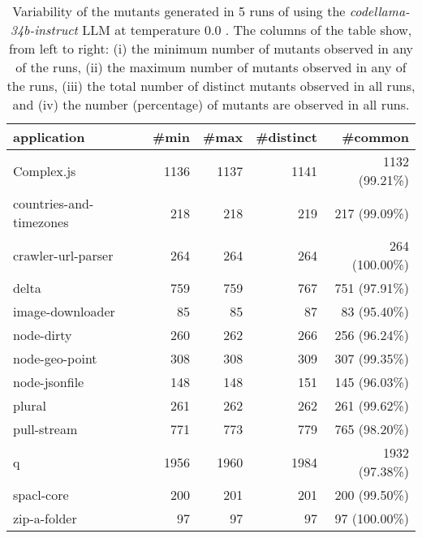 
\begin{table}[hbt!]
\centering
{\footnotesize
\begin{tabular}{l|r|r|r|r}

{\bf application}  & {\bf \#min} &  {\bf \#max} &  {\bf \#distinct} & {\bf \#common}\\
\hline
Complex.js & 1136 & 1137 & 1141 & 1132 (99.21\%) \\ 
countries-and-timezones & 218 & 218 & 219 & 217 (99.09\%) \\ 
crawler-url-parser & 264 & 264 & 264 & 264 (100.00\%) \\ 
delta & 759 & 759 & 767 & 751 (97.91\%) \\ 
image-downloader & 85 & 85 & 87 & 83 (95.40\%) \\ 
node-dirty & 260 & 262 & 266 & 256 (96.24\%) \\ 
node-geo-point & 308 & 308 & 309 & 307 (99.35\%) \\ 
node-jsonfile & 148 & 148 & 151 & 145 (96.03\%) \\ 
plural & 261 & 262 & 262 & 261 (99.62\%) \\ 
pull-stream & 771 & 773 & 779 & 765 (98.20\%) \\ 
q & 1956 & 1960 & 1984 & 1932 (97.38\%) \\ 
spacl-core & 200 & 201 & 201 & 200 (99.50\%) \\ 
zip-a-folder & 97 & 97 & 97 & 97 (100.00\%) \\ 
\end{tabular}
}
\caption{
  Variability of the mutants generated in 5 runs of \ToolName using the \textit{codellama-34b-instruct} LLM
       at temperature 0.0 . The columns of the table show, from left to right:
    (i) the minimum number of mutants observed in any of the runs,
    (ii) the maximum number of mutants observed in any of the runs,
    (iii) the total number of distinct mutants observed in all runs, and
    (iv) the number (percentage) of mutants are observed in all runs.
}
\label{table:Variability_codellama-34b-instruct_0.0}
\end{table}